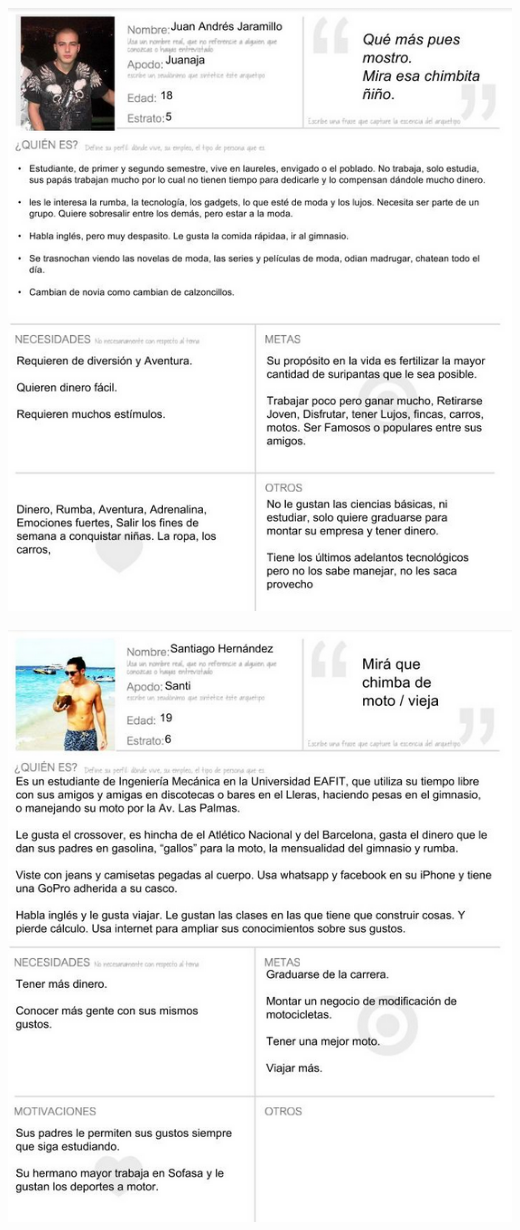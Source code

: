 \documentclass[twoside,letterpaper,11pt]{report}
\begin{document}
\includegraphics[width=1\textwidth]{aux/arquetipo1}

\includegraphics[width=1\textwidth]{aux/arquetipo2}
\end{document}

